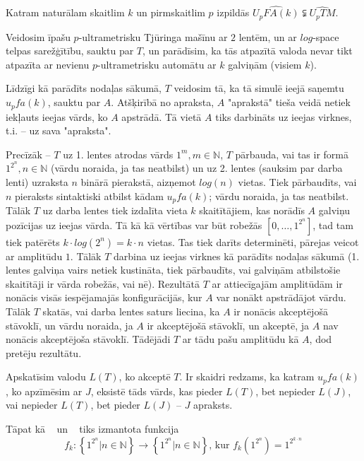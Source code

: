 \documentclass{ludis}
\begin{document}
\begin{teorema}
Katram naturālam skaitlim $k$ un pirmskaitlim $p$ izpildās $\widehat{U_pFA(k)} \subsetneqq \widehat{U_pTM}$.
\end{teorema}
\begin{pieradijums}
Veidosim īpašu $p$-ultrametrisku Tjūringa mašīnu ar $2$ lentēm, un ar $log$-space telpas sarežģītību, sauktu par $T$, un parādīsim, ka tās atpazītā valoda nevar tikt atpazīta ar nevienu $p$-ultrametrisku automātu ar $k$ galviņām (visiem $k$).

Līdzīgi kā parādīts nodaļas sākumā, $T$ veidosim tā, ka tā simulē ieejā saņemtu $u_pfa(k)$, sauktu par $A$. Atšķirībā no apraksta, $A$ "aprakstā" tieša veidā netiek iekļauts ieejas vārds, ko $A$ apstrādā. Tā vietā $A$ tiks darbināts uz ieejas virknes, t.i. -- uz sava "apraksta".

Precīzāk -- $T$ uz 1. lentes atrodas vārds $1^m, m \in \mathbb{N}$, $T$ pārbauda, vai tas ir formā $1^{2^n}, n \in \mathbb{N}$ (vārdu noraida, ja tas neatbilst) un uz 2. lentes (sauksim par darba lenti) uzraksta $n$ binārā pierakstā, aizņemot $log(n)$ vietas. Tiek pārbaudīts, vai $n$ pieraksts sintaktiski atbilst kādam $u_pfa(k)$; vārdu noraida, ja tas neatbilst. Tālāk $T$ uz darba lentes tiek izdalīta vieta $k$ skaitītājiem, kas norādīs $A$ galviņu pozīcijas uz ieejas vārda. Tā kā kā vērtības var būt robežās $\left[0, \ldots, 1^{2^n} \right]$, tad tam tiek patērēts $k \cdot log(2^n)= k \cdot n$ vietas. %
Tas tiek darīts determinēti, pārejas veicot ar amplitūdu $1$. Tālāk $T$ darbina uz ieejas virknes kā parādīts nodaļas sākumā (1. lentes galviņa vairs netiek kustināta, tiek pārbaudīts, vai galviņām atbilstošie skaitītāji ir vārda robežās, vai nē). Rezultātā $T$ ar attiecīgajām amplitūdām ir nonācis visās iespējamajās konfigurācijās, kur $A$ var nonākt apstrādājot vārdu. Tālāk $T$ skatās, vai darba lentes saturs liecina, ka $A$ ir nonācis akceptējošā stāvoklī, un vārdu noraida, ja $A$ ir akceptējošā stāvoklī, un akceptē, ja $A$ nav nonācis akceptējoša stāvoklī. Tādējādi $T$ ar tādu pašu amplitūdu kā $A$, dod pretēju rezultātu.

Apskatīsim valodu $L(T)$, ko akceptē $T$. Ir skaidri redzams, ka katram $u_pfa(k)$, ko apzīmēsim ar $J$, eksistē tāds vārds, kas pieder $L(T)$, bet nepieder $L(J)$, vai nepieder $L(T)$, bet pieder $L(J)$ -- $J$ apraksts.
\end{pieradijums}

Tāpat kā ~\citep{Macarie1995} un ~\citep{Monien1980} tiks izmantota funkcija
\[
	f_k : \left\{ 1^{2^n} | n \in \mathbb{N} \right\} \rightarrow \left\{ 1^{2^n} | n \in \mathbb{N} \right\} \textrm{, kur } f_k( 1^{2^n}) = 1^{2^{k \cdot n}}
\]
\end{document}
